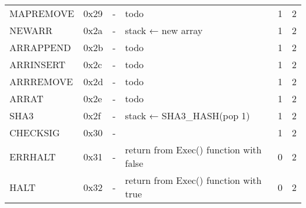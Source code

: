 \begin{longtable}[c]{L{2.5cm} L{1cm} L{3cm} L{5.5cm} R{0.8cm} R{1cm} }
MAPREMOVE & 0x29   & -                                                                                                        & todo                                                                                                        & 1         & 2          \\
NEWARR    & 0x2a   & -                                                                                                        & stack ← new array                                                                                           & 1         & 2          \\
ARRAPPEND & 0x2b   & -                                                                                                        & todo                                                                                                        & 1         & 2          \\
ARRINSERT & 0x2c   & -                                                                                                        & todo                                                                                                        & 1         & 2          \\
ARRREMOVE & 0x2d   & -                                                                                                        & todo                                                                                                        & 1         & 2          \\
ARRAT     & 0x2e   & -                                                                                                        & todo                                                                                                        & 1         & 2          \\
SHA3      & 0x2f   & -                                                                                                        & stack ← SHA3\_HASH(pop 1)                                                                                   & 1         & 2          \\
CHECKSIG  & 0x30   & -                                                                                                        &                                                                                                             & 1         & 2          \\
ERRHALT   & 0x31   & -                                                                                                        & return from Exec() function with false                                                                      & 0         & 2          \\
HALT      & 0x32   & -                                                                                                        & return from Exec() function with true                                                                       & 0         & 2          \\* \bottomrule
\end{longtable}